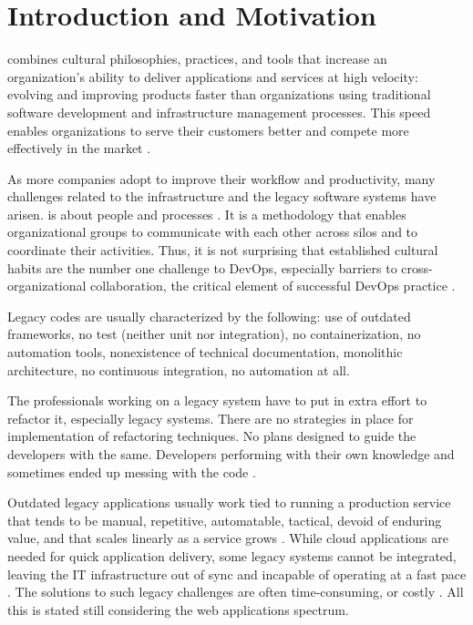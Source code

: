 \chapter{Introduction and Motivation}

\devops combines cultural philosophies, practices, and tools that increase an
organization's ability to deliver applications and services at high velocity:
evolving and improving products faster than organizations using traditional
software development and infrastructure management processes. This speed enables
organizations to serve their customers better and compete more effectively in
the market \cite{amazon2020}.

As more companies adopt \devops to improve their workflow and productivity, many
challenges related to the infrastructure and the legacy software systems have
arisen. \devops is about people and processes \cite{rocha2019}. It is a
methodology that enables organizational groups to communicate with each other
across silos and to coordinate their activities. Thus, it is not surprising that
established cultural habits are the number one challenge to DevOps, especially
barriers to cross-organizational collaboration, the critical element of
successful DevOps practice \cite{saugatuck2014}. 

Legacy codes are usually characterized by the following: use of outdated
frameworks,  no test (neither unit nor integration), no containerization, no
automation tools, nonexistence of technical documentation, monolithic
architecture,  no continuous integration, no automation at all.

The professionals working on a legacy system have to put in extra effort to
refactor it, especially legacy systems. There are no strategies in place for
implementation of refactoring techniques. No plans designed to guide the
developers with the same. Developers performing with their own knowledge and
sometimes ended up messing with the code \cite{khanam2018}.

Outdated legacy applications usually work tied to running a production service
that tends to be manual, repetitive, automatable, tactical, devoid of enduring
value, and that scales linearly as a service grows \cite{google2016}. While
cloud applications are needed for quick application delivery, some legacy
systems cannot be integrated, leaving the IT infrastructure out of sync and
incapable of operating at a fast pace \cite{vassit2018}. The solutions to such
legacy challenges are often time-consuming, or costly \cite{vassit2018}. All
this is stated still considering the web applications spectrum.


